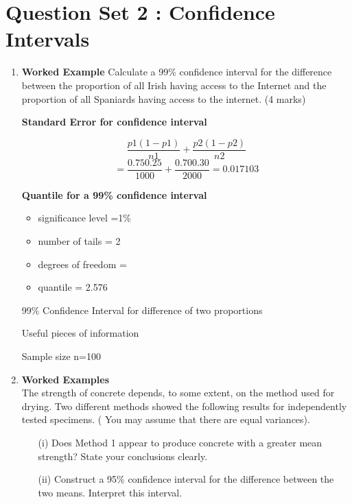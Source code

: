 \section*{Question Set 2 : Confidence Intervals}
\begin{enumerate}
	
	\item \textbf{Worked Example}
	Calculate a 99\% confidence interval for the difference between the proportion of all Irish having access to the
	Internet and the proportion of all Spaniards having access to the internet.  (4 marks)
	
	
	
	\noindent \textbf{Standard Error for confidence interval}	
	
	\[\frac{p1(1 -p1)}{n1}+ \frac{p2(1 -p2)}{n2}\]	
	\[=\frac{0.750.25}{1000}+ \frac{0.700.30}{2000}     =  0.017103\]
	
	\noindent \textbf{Quantile for a 99\% confidence interval}
	\begin{itemize}
		\item 	significance level  =1\%
		\item	number of tails = 2
		\item	degrees of freedom = 
		\item	quantile = 2.576 
	\end{itemize}
	
	
	
	99\% Confidence Interval for difference of two proportions
	
	
	
	Useful pieces of information
	
	
	Sample size  n=100
	
	
	\item \textbf{Worked Examples} \\
	
	The strength of concrete depends, to some extent, on the method used for drying. Two different methods showed the following results for independently tested specimens.  ( You may assume that there are equal variances).
	
	
	\begin{itemize}
		\item[(i)] Does Method 1 appear to produce concrete with a greater mean strength? State your conclusions clearly.
		\item[(ii)] Construct a 95\% confidence interval for the difference between the two means. Interpret this interval.
		

\end{itemize}
\end{enumerate}
